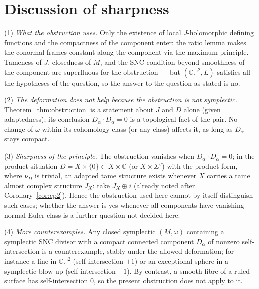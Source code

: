 \documentclass[11pt]{article}
\theoremstyle{definition}
\theoremstyle{remark}
\newcommand{\CC}{\mathbb{C}}
\newcommand{\CP}{\mathbb{CP}}
\begin{document}
\section{Discussion of sharpness}\label{sec:remarks}

\noindent(1) \emph{What the obstruction uses.} Only the existence of
local $J$-holomorphic defining functions and the compactness of the
component enter: the ratio lemma makes the conormal frames constant
along the component via the maximum principle. Tameness of $J$,
closedness of $M$, and the SNC condition beyond smoothness of the
component are superfluous for the obstruction --- but $(\CP^2,L)$
satisfies all the hypotheses of the question, so the answer to the
question as stated is no.

\noindent(2) \emph{The deformation does not help because the
obstruction is not symplectic.} Theorem~\ref{thm:obstruction} is a
statement about $J$ and $D$ alone (given adaptedness); its
conclusion $D_\alpha\cdot D_\alpha=0$ is a topological fact of the
pair. No change of $\omega$ within its cohomology class (or any
class) affects it, as long as $D_\alpha$ stays compact.

\noindent(3) \emph{Sharpness of the principle.} The obstruction
vanishes when $D_\alpha\cdot D_\alpha=0$; in the product situation
$D=X\times\{0\}\subset X\times\CC$ (or $X\times\Sigma^g$) with the
product form, where $\nu_D$ is trivial, an adapted tame structure
exists whenever $X$ carries a tame almost complex structure $J_X$:
take $J_X\oplus i$ (already noted after Corollary~\ref{cor:cp2}).
Hence the obstruction used here cannot by itself distinguish such
cases; whether the answer is yes whenever all components have
vanishing normal Euler class is a further question not decided here.

\noindent(4) \emph{More counterexamples.} Any closed symplectic
$(M,\omega)$ containing a symplectic SNC divisor with a compact
connected component $D_\alpha$ of nonzero self-intersection is a
counterexample, stably under the allowed deformation; for instance a
line in $\CP^2$ (self-intersection $+1$) or an exceptional sphere in
a symplectic blow-up (self-intersection $-1$). By contrast, a smooth
fibre of a ruled surface has self-intersection $0$, so the present
obstruction does not apply to it.
\end{document}
